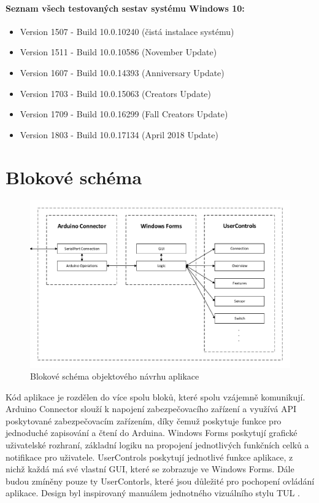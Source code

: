 \documentclass[FM,DP]{tulthesis}  %
\begin{document}
\paragraph{Seznam všech testovaných sestav systému Windows 10:}
\begin{itemize}
\item Version 1507 - Build 10.0.10240 (čistá instalace systému)
\item Version 1511 - Build 10.0.10586 (November Update)
\item Version 1607 - Build 10.0.14393 (Anniversary Update)
\item Version 1703 - Build 10.0.15063 (Creators Update)
\item Version 1709 - Build 10.0.16299 (Fall Creators Update)
\item Version 1803 - Build 10.0.17134 (April 2018 Update)
\end{itemize}

\section{Blokové schéma}

\begin{figure}[H]
\begin{center}
\includegraphics[width=\textwidth]{vector/blokoveSchemaSecurityControl.pdf}
\caption{Blokové schéma objektového návrhu aplikace}
\label{image}
\end{center}
\end{figure}

Kód aplikace je rozdělen do více spolu bloků, které spolu vzájemně komunikují. Arduino Connector slouží k napojení zabezpečovacího zařízení a využívá API poskytované zabezpečovacím zařízením, díky čemuž poskytuje funkce pro jednoduché zapisování a čtení do Arduina. Windows Forms poskytují grafické uživatelské rozhraní, základní logiku na propojení jednotlivých funkčních celků a notifikace pro uživatele. UserControls poskytují jednotlivé funkce aplikace, z nichž každá má své vlastní GUI, které se zobrazuje ve Windows Forms. Dále budou zmíněny pouze ty UserContorls, které jsou důležité pro pochopení ovládání aplikace. Design byl inspirovaný manuálem jednotného vizuálního stylu TUL \cite{TULVisual}.
\end{document}
